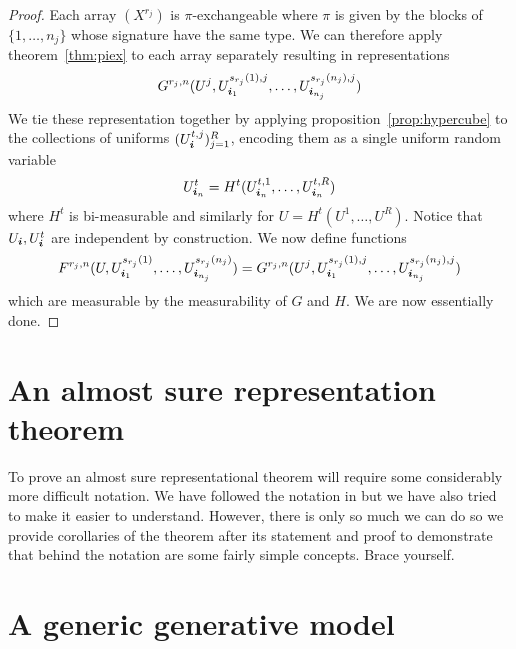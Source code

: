 \begin{proof}
  Each array $(X^{r_j})$ is $\pi$-exchangeable where $\pi$ is given by the blocks of $\{1,\dots,n_j\}$ whose signature have the same type.
  We can therefore apply theorem~\ref{thm:piex} to each array separately resulting in representations
\begin{equation}
  G^{r_j,n}(U^j,U^{s_{r_j}(1),j}_{\bm{i}_1},\dots,U^{s_{r_j}(n_j),j}_{\bm{i}_{n_j}})
\end{equation}
We tie these representation together by applying proposition~\ref{prop:hypercube} to the collections of uniforms $(U^{t,j}_{\bm{i}})_{j=1}^R$, encoding them as a single uniform random variable
\begin{equation}
  U^t_{\bm{i}_n} = H^t(U^{t,1}_{\bm{i}_n},\dots,U^{t,R}_{\bm{i}_n})
\end{equation}
where $H^t$ is bi-measurable and similarly for $U = H^t(U^{1},\dots,U^{R})$.
Notice that $U_{\bm{i}}, U^t_{\bm{i}}$ are independent by construction.
We now define functions
\begin{equation}
F^{r_j,n}(U,U^{s_{r_j}(1)}_{\bm{i}_1},\dots,U^{s_{r_j}(n_j)}_{\bm{i}_{n_j}}) = G^{r_j,n}(U^j,U^{s_{r_j}(1),j}_{\bm{i}_1},\dots,U^{s_{r_j}(n_j),j}_{\bm{i}_{n_j}})
\end{equation}
which are measurable by the measurability of $G$ and $H$.
We are now essentially done.
\end{proof}

\begin{rem}
\label{rem:randfunc}
\end{rem}

\section{An almost sure representation theorem}
\label{sec:almost_sure}

To prove an almost sure representational theorem will require some considerably more difficult notation.
We have followed the notation in  but we have also tried to make it easier to understand.
However, there is only so much we can do so we provide corollaries of the theorem after its statement and proof to demonstrate that behind the notation are some fairly simple concepts.
Brace yourself.

\section{A generic generative model}

